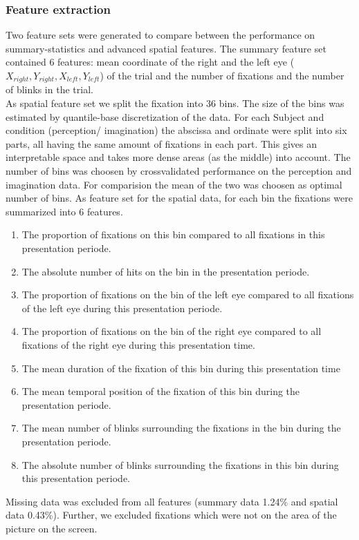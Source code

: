 \documentclass[a4paper,man,natbib,floatsintext]{apa6}
\begin{document}
\subsubsection{Feature extraction}
Two feature sets were generated to compare between the performance on summary-statistics and advanced spatial features. 
The summary feature set contained 6 features: mean coordinate of the right and the left eye ($X_{right},Y_{right},X_{left},Y_{left}$) of the trial and the number of fixations and the number of blinks in the trial. \\
As spatial feature set we split the fixation into 36 bins. The size of the bins was estimated by quantile-base discretization of  the data. For each Subject and condition (perception/ imagination) the abscissa and ordinate were split into six parts, all having the same amount of fixations in each part. This gives an interpretable space and takes more dense areas (as the middle) into account. The number of bins was choosen by crossvalidated performance on the perception and imagination data. For comparision the mean of the two was choosen as optimal number of bins.%
As feature set for the spatial data, for each bin the fixations were summarized into 6 features. 
 \begin{enumerate}
\item The proportion of fixations on this bin compared to all fixations in this presentation periode. 
\item The absolute number of hits on the bin in the presentation periode.
\item The proportion of fixations on the bin of the left eye compared to all fixations of the left eye during this presentation periode.
\item The proportion of fixations on the bin of the right eye compared to all fixations of the right eye during this presentation time. 
\item The mean duration of the fixation of this bin during this presentation time
\item The mean temporal position of the fixation of this bin during the presentation periode.
\item The mean number of blinks surrounding the fixations in the bin during the presentation periode.
\item The absolute number of blinks surrounding the fixations in this bin during this presentation periode.
\end{enumerate}
Missing data was excluded from all features (summary data 1.24\% and spatial data 0.43\%). Further, we excluded fixations which were not on the area of the picture on the screen. \\
\end{document}
